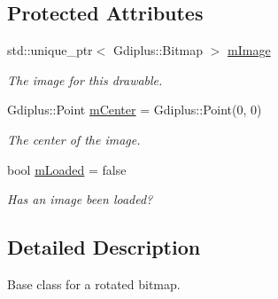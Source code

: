 \subsection*{Protected Attributes}
\begin{DoxyCompactItemize}
\item 
\hypertarget{class_c_rotated_bitmap_aacdd9cba61ed0a8a5b90ee0a40bc18df}{std\+::unique\+\_\+ptr$<$ Gdiplus\+::\+Bitmap $>$ \hyperlink{class_c_rotated_bitmap_aacdd9cba61ed0a8a5b90ee0a40bc18df}{m\+Image}}\label{class_c_rotated_bitmap_aacdd9cba61ed0a8a5b90ee0a40bc18df}

\begin{DoxyCompactList}\small\item\em The image for this drawable. \end{DoxyCompactList}\item 
\hypertarget{class_c_rotated_bitmap_a67c587b5b5d6dfb609708a3c62f37a0d}{Gdiplus\+::\+Point \hyperlink{class_c_rotated_bitmap_a67c587b5b5d6dfb609708a3c62f37a0d}{m\+Center} = Gdiplus\+::\+Point(0, 0)}\label{class_c_rotated_bitmap_a67c587b5b5d6dfb609708a3c62f37a0d}

\begin{DoxyCompactList}\small\item\em The center of the image. \end{DoxyCompactList}\item 
\hypertarget{class_c_rotated_bitmap_a99f6dbd45bf8cb36b1eaa101520789bf}{bool \hyperlink{class_c_rotated_bitmap_a99f6dbd45bf8cb36b1eaa101520789bf}{m\+Loaded} = false}\label{class_c_rotated_bitmap_a99f6dbd45bf8cb36b1eaa101520789bf}

\begin{DoxyCompactList}\small\item\em Has an image been loaded? \end{DoxyCompactList}\end{DoxyCompactItemize}


\subsection{Detailed Description}
Base class for a rotated bitmap. 

